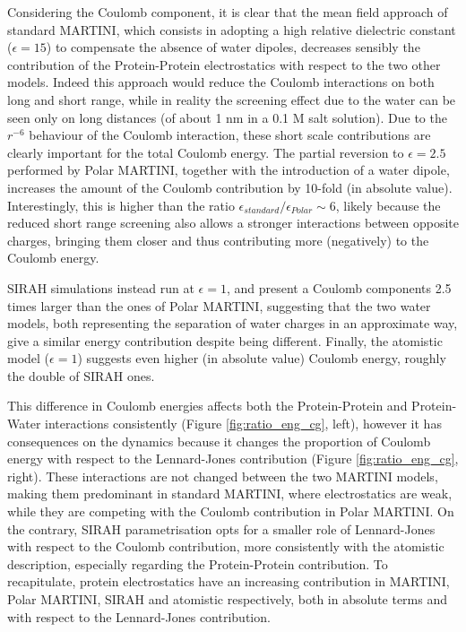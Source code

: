 Considering the Coulomb component, it is clear that the mean field approach of standard MARTINI, which consists in adopting a high relative dielectric constant ($\epsilon = 15$) to compensate the absence of water dipoles, decreases sensibly the contribution of the Protein-Protein electrostatics with respect to the two other models.
%
Indeed this approach would reduce the Coulomb interactions on both long and short range, while in reality the screening effect due to the water can be seen only on long distances (of about 1 nm in a 0.1 M salt solution). Due to the $r^{-6}$ behaviour of the Coulomb interaction, these short scale contributions are clearly important for the total Coulomb energy.
%
The partial reversion to $\epsilon = 2.5$ performed by Polar MARTINI, together with the introduction of a water dipole, increases the amount of the Coulomb contribution by 10-fold (in absolute value).
%
Interestingly, this is higher than the ratio $\epsilon_{standard}/\epsilon_{Polar} \sim 6$, likely because the reduced short range screening also allows a stronger interactions between opposite charges, bringing them closer and thus contributing more (negatively) to the Coulomb energy.

SIRAH simulations instead run at $\epsilon = 1$, and present a Coulomb components 2.5 times larger than the ones of Polar MARTINI, suggesting that the two water models, both representing the separation of water charges in an approximate way, give a similar energy contribution despite being different.
%
Finally, the atomistic model ($\epsilon = 1$) suggests even higher (in absolute value) Coulomb energy, roughly the double of SIRAH ones.


This difference in Coulomb energies affects both the Protein-Protein and Protein-Water interactions consistently (Figure \ref{fig:ratio_eng_cg}, left), however it has consequences on the dynamics because it changes the proportion of Coulomb energy with respect to the Lennard-Jones contribution (Figure \ref{fig:ratio_eng_cg}, right). These interactions are not changed between the two MARTINI models, making them predominant in standard MARTINI, where electrostatics are weak, while they are competing with the Coulomb contribution in Polar MARTINI.
%
On the contrary, SIRAH parametrisation opts for a smaller role of Lennard-Jones with respect to the Coulomb contribution, more consistently with the atomistic description, especially regarding the Protein-Protein contribution.
%
To recapitulate, protein electrostatics have an increasing contribution in MARTINI, Polar MARTINI, SIRAH and atomistic respectively, both in absolute terms and with respect to the Lennard-Jones contribution.

